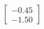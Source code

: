 \documentclass[preview]{standalone}
\begin{document}
\begin{align*}
\begin{bmatrix} -0.45 \\ -1.50 \end{bmatrix}
\end{align*}
\end{document}
